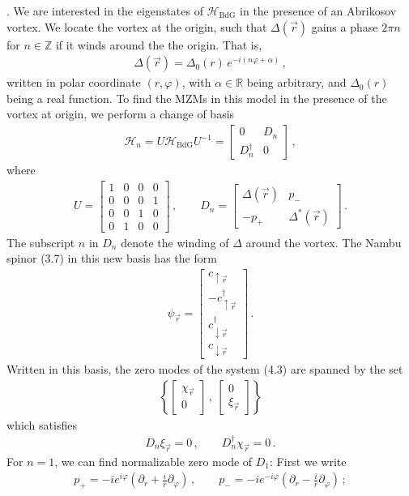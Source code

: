 \documentclass[11pt, oneside]{book}
\theoremstyle{break}
\theoremstyle{break}
\newcommand{\R}{\mathbb{R}}
\newcommand{\Z}{\mathbb{Z}}
\newcommand{\pd}{\partial}
\newcommand{\bmat}[1]{\begin{bmatrix} #1 \end{bmatrix}}
\begin{document}
. We are interested in the eigenstates of $\mathcal{H}_{\text{BdG}}$ in the presence of an Abrikosov vortex. We locate the vortex at the origin, such that $\Delta(\vec{r})$ gains a phase $2\pi n$ for $n \in \Z$ if it winds around the the origin. That is,
\begin{align}
\Delta(\vec{r}) = \Delta_0(r) \, e^{-i(n\varphi+\alpha)}\,,
\end{align}
written in polar coordinate $(r, \varphi)$, with $\alpha\in \R$ being arbitrary, and $\Delta_0(r)$ being a real function. To find the MZMs in this model in the presence of the vortex at origin, we perform a change of basis
\begin{align}
\mathcal{H}_n = U \mathcal{H}_{\text{BdG}} U^{-1} = \bmat{0& D_n \\ D_n^\dagger & 0}\,, 
\end{align}
where
\begin{align}
U = \bmat{1& 0 & 0 & 0 \\
0 & 0 & 0 & 1\\
0 & 0 & 1 & 0\\
0 & 1 & 0 & 0}\,,\qquad
D_n = \bmat{\Delta(\vec{r}) & p_- \\ -p_+ & \Delta^*(\vec{r})}\,.
\end{align}
The subscript $n$ in $D_n$ denote the winding of $\Delta$ around the vortex. The Nambu spinor (3.7) in this new basis has the form
\begin{align}
\psi_{\vec{r}} = \bmat{c_{\uparrow\vec{r}}\\ -c_{\uparrow\vec{r}}^\dagger \\ c_{\downarrow\vec{r}}^\dagger \\ c_{\downarrow\vec{r}}} \,.
\end{align}
Written in this basis, the zero modes of the system (4.3) are spanned by the set
\begin{align}
\left\{\bmat{\chi_{\vec{r}}\\ 0}\,,\ 
\bmat{0\\\xi_{\vec{r}}}\right\}
\end{align}
which satisfies
\begin{align}
D_n\xi_{\vec{r}} = 0\,,\qquad
D_n^\dagger \chi_{\vec{r}} = 0\,.
\end{align}
For $n = 1$, we can find normalizable zero mode of $D_1$: First we write
\begin{align}
p_+ = -ie^{i\varphi} \left( \pd_r + \frac{i}{r}\pd_\varphi\right)\,,\qquad 
p_- =-ie^{-i\varphi}\left(\pd_r - \frac{i}{r}\pd_\varphi\right) \,;
\end{align}
\end{document}
